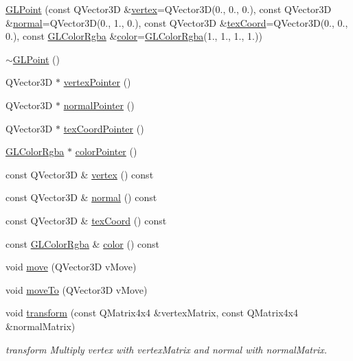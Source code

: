 \begin{DoxyCompactItemize}
\item 
\mbox{\hyperlink{class_g_l_point_a41a36ef6e07c906a279c866e86f2f241}{G\+L\+Point}} (const Q\+Vector3D \&\mbox{\hyperlink{class_g_l_point_a4766a3f463b4e46cd3af53a6d17cdd69}{vertex}}=Q\+Vector3D(0., 0., 0.), const Q\+Vector3D \&\mbox{\hyperlink{class_g_l_point_a4506f53f6b5312d3ec37cdbf566d57c8}{normal}}=Q\+Vector3D(0., 1., 0.), const Q\+Vector3D \&\mbox{\hyperlink{class_g_l_point_ac496dbef3a6ee7adc444b4e0c5d99ba0}{tex\+Coord}}=Q\+Vector3D(0., 0., 0.), const \mbox{\hyperlink{class_g_l_color_rgba}{G\+L\+Color\+Rgba}} \&\mbox{\hyperlink{class_g_l_point_a7f360810a20e379f02c1f2a00f56cc3e}{color}}=\mbox{\hyperlink{class_g_l_color_rgba}{G\+L\+Color\+Rgba}}(1., 1., 1., 1.))
\item 
\mbox{\hyperlink{class_g_l_point_a724612288b8fecea43cdb207e6e447cf}{$\sim$\+G\+L\+Point}} ()
\item 
Q\+Vector3D $\ast$ \mbox{\hyperlink{class_g_l_point_a5582523837a5fbae6aeaf7c360553c0b}{vertex\+Pointer}} ()
\item 
Q\+Vector3D $\ast$ \mbox{\hyperlink{class_g_l_point_a453d3148640b4a6a5bb8596370f236f8}{normal\+Pointer}} ()
\item 
Q\+Vector3D $\ast$ \mbox{\hyperlink{class_g_l_point_ad4cffce86ff32bfbdbbbe6b884f354c6}{tex\+Coord\+Pointer}} ()
\item 
\mbox{\hyperlink{class_g_l_color_rgba}{G\+L\+Color\+Rgba}} $\ast$ \mbox{\hyperlink{class_g_l_point_a86adf137055461d018700894c4c5f377}{color\+Pointer}} ()
\item 
const Q\+Vector3D \& \mbox{\hyperlink{class_g_l_point_a4766a3f463b4e46cd3af53a6d17cdd69}{vertex}} () const
\item 
const Q\+Vector3D \& \mbox{\hyperlink{class_g_l_point_a4506f53f6b5312d3ec37cdbf566d57c8}{normal}} () const
\item 
const Q\+Vector3D \& \mbox{\hyperlink{class_g_l_point_ac496dbef3a6ee7adc444b4e0c5d99ba0}{tex\+Coord}} () const
\item 
const \mbox{\hyperlink{class_g_l_color_rgba}{G\+L\+Color\+Rgba}} \& \mbox{\hyperlink{class_g_l_point_a7f360810a20e379f02c1f2a00f56cc3e}{color}} () const
\item 
void \mbox{\hyperlink{class_g_l_point_adf9e0baf9c965a9642f34672e6564e9a}{move}} (Q\+Vector3D v\+Move)
\item 
void \mbox{\hyperlink{class_g_l_point_ab85d8d026e488d1c28fdb00c1ab9ad12}{move\+To}} (Q\+Vector3D v\+Move)
\item 
void \mbox{\hyperlink{class_g_l_point_a1e65d4eb8478a28ea1ebe6bd98e26837}{transform}} (const Q\+Matrix4x4 \&vertex\+Matrix, const Q\+Matrix4x4 \&normal\+Matrix)
\begin{DoxyCompactList}\small\item\em transform Multiply vertex with vertex\+Matrix and normal with normal\+Matrix. \end{DoxyCompactList}\end{DoxyCompactItemize}
